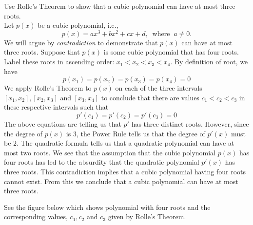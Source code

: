 \documentclass[handout]{ximera}
\begin{document}
\begin{example}[example 2] Use Rolle's Theorem  to show that a cubic polynomial can have at most three roots.\\



Let $p(x)$ be a cubic polynomial, i.e., 
\[
p(x) = ax^3 + bx^2 + cx + d, \;\; \text{where} \;\; a\neq 0.
\]
We will argue by {\it contradiction} to demonstrate that $p(x)$ can have at most three roots.
Suppose that $p(x)$ is some cubic polynomial that has four roots.  Label these roots in ascending order: $x_1 <  x_2 < x_3 < x_4$.
By definition of root, we have
\[
p(x_1) = p(x_2) = p(x_3) = p(x_4) = 0
\]
We apply Rolle's Theorem to $p(x)$ on each of the three intervals $[x_1, x_2], [x_2, x_3]$ and $[x_3, x_4]$ to conclude that 
there are values $c_1 < c_2 < c_3$ in these respective intervals such that
\[
p'(c_1) = p'(c_2) = p'(c_3) = 0
\]
The above equations are telling us that $p'$ has three distinct roots.
However, since the degree of $p(x)$ is $3$, the Power Rule tells us that the degree of $p'(x)$ must be $2$.
The quadratic formula tells us that a quadratic polynomial can have at most two roots.
We see that the assumption that the cubic polynomial $p(x)$ has four roots has led to the absurdity that 
the quadratic polynomial $p'(x)$ has three roots.
This contradiction implies that a cubic polynomial having four roots cannot exist.
From this we conclude that a cubic polynomial can have at most three roots.

See the figure below which shows polynomial with four roots and the corresponding values, $c_1, c_2$ and $c_3$ given by Rolle's Theorem.

\begin{image}
\end{image}

\end{example}
\end{document}
